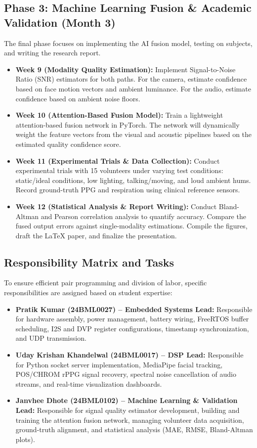 \documentclass[11pt,a4paper]{article}
\begin{document}
\subsection{Phase 3: Machine Learning Fusion \& Academic Validation (Month 3)}
The final phase focuses on implementing the AI fusion model, testing on subjects, and writing the research report.
\begin{itemize}
    \item \textbf{Week 9 (Modality Quality Estimation):} Implement Signal-to-Noise Ratio (SNR) estimators for both paths. For the camera, estimate confidence based on face motion vectors and ambient luminance. For the audio, estimate confidence based on ambient noise floors.
    \item \textbf{Week 10 (Attention-Based Fusion Model):} Train a lightweight attention-based fusion network in PyTorch. The network will dynamically weight the feature vectors from the visual and acoustic pipelines based on the estimated quality confidence score.
    \item \textbf{Week 11 (Experimental Trials \& Data Collection):} Conduct experimental trials with 15 volunteers under varying test conditions: static/ideal conditions, low lighting, talking/moving, and loud ambient hums. Record ground-truth PPG and respiration using clinical reference sensors.
    \item \textbf{Week 12 (Statistical Analysis \& Report Writing):} Conduct Bland-Altman and Pearson correlation analysis to quantify accuracy. Compare the fused output errors against single-modality estimations. Compile the figures, draft the LaTeX paper, and finalize the presentation.
\end{itemize}

\subsection{Responsibility Matrix and Tasks}
To ensure efficient pair programming and division of labor, specific responsibilities are assigned based on student expertise:
\begin{itemize}
    \item \textbf{Pratik Kumar (24BML0027) -- Embedded Systems Lead:} Responsible for hardware assembly, power management, battery wiring, FreeRTOS buffer scheduling, I2S and DVP register configurations, timestamp synchronization, and UDP transmission.
    \item \textbf{Uday Krishan Khandelwal (24BML0017) -- DSP Lead:} Responsible for Python socket server implementation, MediaPipe facial tracking, POS/CHROM rPPG signal recovery, spectral noise cancellation of audio streams, and real-time visualization dashboards.
    \item \textbf{Janvhee Dhote (24BML0102) -- Machine Learning \& Validation Lead:} Responsible for signal quality estimator development, building and training the attention fusion network, managing volunteer data acquisition, ground-truth alignment, and statistical analysis (MAE, RMSE, Bland-Altman plots).
\end{itemize}
\end{document}
